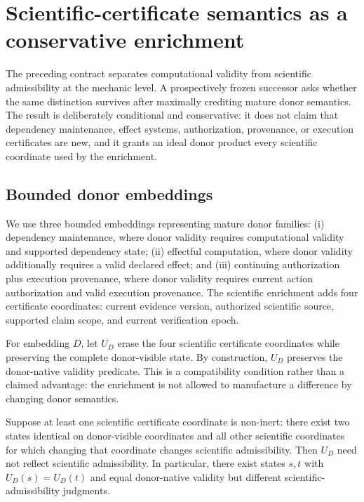 \section{Scientific-certificate semantics as a conservative enrichment}
\label{sec:v3-certificate-semantics}

The preceding contract separates computational validity from scientific admissibility at the mechanic level. A prospectively frozen successor asks whether the same distinction survives after maximally crediting mature donor semantics. The result is deliberately conditional and conservative: it does not claim that dependency maintenance, effect systems, authorization, provenance, or execution certificates are new, and it grants an ideal donor product every scientific coordinate used by the enrichment.

\subsection{Bounded donor embeddings}
We use three bounded embeddings representing mature donor families: (i) dependency maintenance, where donor validity requires computational validity and supported dependency state; (ii) effectful computation, where donor validity additionally requires a valid declared effect; and (iii) continuing authorization plus execution provenance, where donor validity requires current action authorization and valid execution provenance. The scientific enrichment adds four certificate coordinates: current evidence version, authorized scientific source, supported claim scope, and current verification epoch.

For embedding $D$, let $U_D$ erase the four scientific certificate coordinates while preserving the complete donor-visible state. By construction, $U_D$ preserves the donor-native validity predicate. This is a compatibility condition rather than a claimed advantage: the enrichment is not allowed to manufacture a difference by changing donor semantics.

\begin{theorem}
Suppose at least one scientific certificate coordinate is non-inert: there exist two states identical on donor-visible coordinates and all other scientific coordinates for which changing that coordinate changes scientific admissibility. Then $U_D$ need not reflect scientific admissibility. In particular, there exist states $s,t$ with $U_D(s)=U_D(t)$ and equal donor-native validity but different scientific-admissibility judgments.
\end{theorem}

